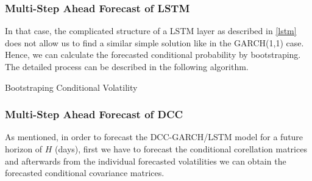 \documentclass[a4paper, oneside]{discothesis}
\begin{document}
\subsubsection{Multi-Step Ahead Forecast of LSTM}\label{lstmFor}
In that case, the complicated structure of a LSTM layer as described in \ref{lstm} does not allow us to find a similar simple solution like in the GARCH(1,1) case. Hence, we can calculate the forecasted conditional probability by bootstraping. The detailed process can be described in the following algorithm.
\begin{algorithm}[H]
\caption{Bootstraping Conditional Volatility}
\begin{algorithmic}
\end{algorithmic}
\end{algorithm}

\subsubsection{Multi-Step Ahead Forecast of DCC}\label{dccFor}

As mentioned, in order to forecast the DCC-GARCH/LSTM model for a future horizon of $H$ (days), first we have to forecast the conditional corellation matrices and afterwards from the individual forecasted volatilities we can obtain the forecasted conditional covariance matrices.
\end{document}
